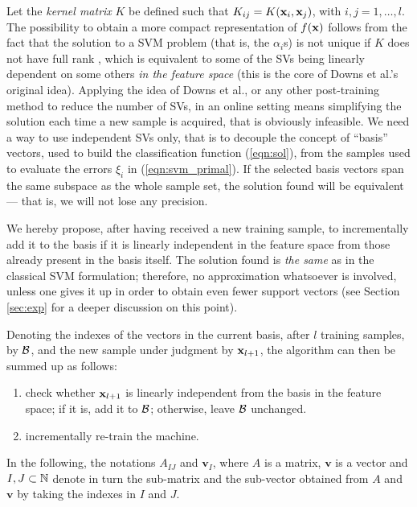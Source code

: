 Let the \emph{kernel matrix} $K$ be defined such that $K_{ij} =
K(\mathbf{x}_i,\mathbf{x}_j)$, with $i,j=1,\ldots,l$. The possibility to obtain a more
compact representation of $f(\mathbf{x})$ follows from the fact that the
solution to a SVM problem (that is, the $\alpha_i$s) is not unique if
$K$ does not have full rank \cite{Burges98}, which is equivalent to
some of the SVs being linearly dependent on some others \emph{in the
feature space} (this is the core of Downs et al.'s \cite{DownsGM01}
original idea).
Applying the idea of Downs et al., or any other post-training
method to reduce the number of SVs, in an online setting means simplifying the
solution each time a new sample is acquired, that is obviously infeasible.
We need a way to use independent SVs only, that is to
decouple the concept of ``basis'' vectors, used to build
the classification function (\ref{eqn:sol}), from the samples
used to evaluate the errors $\xi_i$ in (\ref{eqn:svm_primal}).
If the selected basis vectors span the same subspace as
the whole sample set, the solution found will be equivalent
--- that is, we will not lose any precision.

We hereby propose, after having received a new training sample, to
incrementally add it to the basis if it is linearly independent in the
feature space from those already present in the basis itself. The
solution found is \emph{the same} as in the classical SVM formulation;
therefore, no approximation whatsoever is involved, unless one gives
it up in order to obtain even fewer support vectors (see Section
\ref{sec:exp} for a deeper discussion on this point).

Denoting the indexes of the vectors in the current basis, after $l$
training samples, by $\mathcal{B}$, and the new sample under judgment by
$\mathbf{x}_{l+1}$, the algorithm can then be summed up as follows:

\begin{enumerate}

  \item check whether $\mathbf{x}_{l+1}$ is linearly independent from the
        basis in the feature space; if it is, add it to $\mathcal{B}$;
        otherwise, leave $\mathcal{B}$ unchanged.

  \item incrementally re-train the machine.

\end{enumerate}

In the following, the notations $A_{IJ}$ and $\mathbf{v}_I$, where $A$
is a matrix, $\mathbf{v}$ is a vector and $I,J \subset \mathbb{N}$ denote in
turn the sub-matrix and the sub-vector obtained from $A$ and
$\mathbf{v}$ by taking the indexes in $I$ and $J$.

